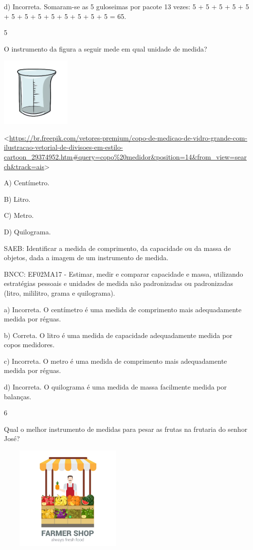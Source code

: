 \begin{escolha}
\begin{escolha}
{{{{{{{{d) Incorreta. Somaram-se as 5 guloseimas por pacote 13 vezes: 5 + 5 + 5 + 5 +
5 + 5 + 5 + 5 + 5 + 5 + 5 + 5 + 5 = 65.

\num{5}

O instrumento da figura a seguir mede em qual unidade de medida?

\includegraphics[width=1.36285in,height=1.36285in]{media/image165.png}

\textless{}\url{https://br.freepik.com/vetores-premium/copo-de-medicao-de-vidro-grande-com-ilustracao-vetorial-de-divisoes-em-estilo-cartoon_29374952.htm\#query=copo\%20medidor\&position=14\&from_view=search\&track=ais}\textgreater{}

A) Centímetro.

B) Litro.

C) Metro.

D) Quilograma.

SAEB: Identificar a medida de comprimento, da capacidade ou da
massa de objetos, dada a imagem de um instrumento de medida.

BNCC: EF02MA17 - Estimar, medir e comparar capacidade
e massa, utilizando estratégias pessoais e unidades de medida não
padronizadas ou padronizadas (litro, mililitro, grama e quilograma).

a) Incorreta. O centímetro é uma medida de comprimento mais adequadamente medida por réguas.

b) Correta. O litro é uma medida de capacidade adequadamente medida por copos medidores.

c) Incorreta. O metro é uma medida de comprimento mais adequadamente medida por réguas.

d) Incorreta. O quilograma é uma medida de massa facilmente medida por balanças.

\num{6}

Qual o melhor instrumento de medidas para pesar as frutas na frutaria do
senhor José?

\includegraphics[width=2.72569in,height=2.04904in]{media/image166.png}

}}}}}}}}
\end{escolha}
\end{escolha}
